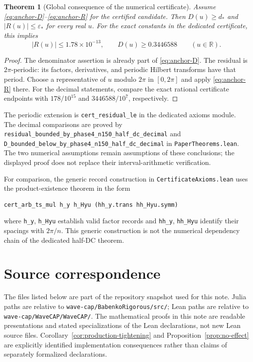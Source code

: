 \documentclass[11pt]{article}
\newtheorem{theorem}{Theorem}[section]
\theoremstyle{definition}
\theoremstyle{remark}
\newcommand{\R}{\mathbb R}
\newcommand{\code}[1]{\nolinkurl{#1}}
\numberwithin{equation}{section}
\begin{document}
\begin{theorem}[Global consequence of the numerical certificate]
\label{thm:certificate}
Assume \eqref{eq:anchor-D}--\eqref{eq:anchor-R} for the certified candidate.
Then $D(u)\geq d_*$ and $|R(u)|\leq\varepsilon_*$ for every real $u$.
For the exact constants in the dedicated certificate, this implies
\begin{equation}
 |R(u)|\leq1.78\times10^{-13},\qquad D(u)\geq0.3446588
 \qquad(u\in\R).
\end{equation}
\end{theorem}
\begin{proof}
The denominator assertion is already part of \eqref{eq:anchor-D}.
The residual is $2\pi$-periodic: its factors, derivatives, and periodic
Hilbert transforms have that period. Choose a representative of $u$
modulo $2\pi$ in $[0,2\pi]$ and apply \eqref{eq:anchor-R} there.
For the decimal statements, compare the exact rational certificate
endpoints with $178/10^{15}$ and $3446588/10^7$, respectively.
\end{proof}
The periodic extension is \code{cert_residual_le} in the dedicated
axioms module. The decimal comparisons are proved by
\code{residual_bounded_by_phase4_n150_half_dc_decimal} and
\code{D_bounded_below_by_phase4_n150_half_dc_decimal} in
\code{PaperTheorems.lean}. The two numerical
assumptions remain assumptions of these conclusions; the displayed proof
does not replace their interval-arithmetic verification.

For comparison, the generic record construction in
\code{CertificateAxioms.lean} uses the product-existence theorem in the form
\begin{lstlisting}
cert_arb_ts_mul h_y h_Hyu (hh_y.trans hh_Hyu.symm)
\end{lstlisting}
where \code{h_y}, \code{h_Hyu} establish valid factor records and
\code{hh_y}, \code{hh_Hyu} identify their spacings with $2\pi/n$.
This generic construction is not the numerical dependency chain of the
dedicated half-DC theorem.

\section{Source correspondence}
\label{sec:sources}

The files listed below are part of the repository snapshot used for this
note. Julia paths are relative to \code{wave-cap/BabenkoRigorous/src/};
Lean paths are relative to \code{wave-cap/WaveCAP/WaveCAP/}.
The mathematical proofs in this note are readable presentations and stated
specializations of the Lean declarations, not new Lean source files.
Corollary~\ref{cor:production-tightening} and
Proposition~\ref{prop:no-effect} are explicitly identified implementation
consequences rather than claims of separately formalized declarations.
\end{document}
